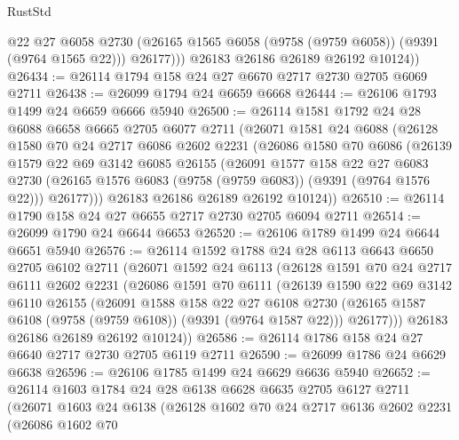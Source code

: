 \begin{lexlean}{RustStd}
\begin{coremodule}
              @22
              @27
              @6058
              @2730
              (@26165 @1565 @6058 (@9758 (@9759 @6058)) (@9391 (@9764 @1565 @22)))
              @26177)))
        @26183
        @26186
        @26189
        @26192
        @10124))
@26434 := @26114 @1794 @158 @24 @27 @6670 @2717 @2730 @2705 @6069 @2711
@26438 := @26099 @1794 @24 @6659 @6668
@26444 := @26106 @1793 @1499 @24 @6659 @6666 @5940
@26500 := @26114
    @1581
    @1792
    @24
    @28
    @6088
    @6658
    @6665
    @2705
    @6077
    @2711
    (@26071
      @1581
      @24
      @6088
      (@26128
        @1580
        @70
        @24
        @2717
        @6086
        @2602
        @2231
        (@26086
          @1580
          @70
          @6086
          (@26139
            @1579
            @22
            @69
            @3142
            @6085
            @26155
            (@26091
              @1577
              @158
              @22
              @27
              @6083
              @2730
              (@26165 @1576 @6083 (@9758 (@9759 @6083)) (@9391 (@9764 @1576 @22)))
              @26177)))
        @26183
        @26186
        @26189
        @26192
        @10124))
@26510 := @26114 @1790 @158 @24 @27 @6655 @2717 @2730 @2705 @6094 @2711
@26514 := @26099 @1790 @24 @6644 @6653
@26520 := @26106 @1789 @1499 @24 @6644 @6651 @5940
@26576 := @26114
    @1592
    @1788
    @24
    @28
    @6113
    @6643
    @6650
    @2705
    @6102
    @2711
    (@26071
      @1592
      @24
      @6113
      (@26128
        @1591
        @70
        @24
        @2717
        @6111
        @2602
        @2231
        (@26086
          @1591
          @70
          @6111
          (@26139
            @1590
            @22
            @69
            @3142
            @6110
            @26155
            (@26091
              @1588
              @158
              @22
              @27
              @6108
              @2730
              (@26165 @1587 @6108 (@9758 (@9759 @6108)) (@9391 (@9764 @1587 @22)))
              @26177)))
        @26183
        @26186
        @26189
        @26192
        @10124))
@26586 := @26114 @1786 @158 @24 @27 @6640 @2717 @2730 @2705 @6119 @2711
@26590 := @26099 @1786 @24 @6629 @6638
@26596 := @26106 @1785 @1499 @24 @6629 @6636 @5940
@26652 := @26114
    @1603
    @1784
    @24
    @28
    @6138
    @6628
    @6635
    @2705
    @6127
    @2711
    (@26071
      @1603
      @24
      @6138
      (@26128
        @1602
        @70
        @24
        @2717
        @6136
        @2602
        @2231
        (@26086
          @1602
          @70

\end{coremodule}
\end{lexlean}
